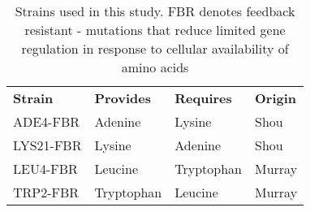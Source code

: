 \begin{table}[]
\centering
\caption{Strains used in this study. FBR denotes feedback resistant - mutations that reduce limited gene regulation in response to cellular availability of amino acids}
\label{my-label}
\begin{tabular}{llll}
\textbf{Strain} & \textbf{Provides} & \textbf{Requires} & \textbf{Origin} \\
ADE4-FBR        & Adenine           & Lysine            & Shou            \\
LYS21-FBR       & Lysine            & Adenine           & Shou            \\
LEU4-FBR        & Leucine           & Tryptophan        & Murray          \\
TRP2-FBR        & Tryptophan        & Leucine           & Murray         
\end{tabular}

\end{table}